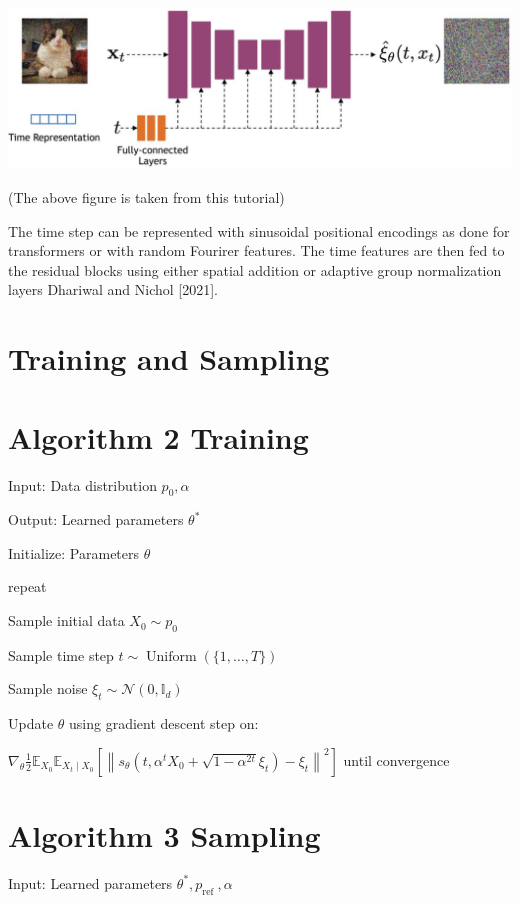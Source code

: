 \documentclass[10pt]{article}
\begin{document}
\begin{center}
\includegraphics[max width=\textwidth]{2024_01_08_a381fc3992661ee7020eg-17}
\end{center}

(The above figure is taken from this tutorial)

The time step can be represented with sinusoidal positional encodings as done for transformers or with random Fourirer features. The time features are then fed to the residual blocks using either spatial addition or adaptive group normalization layers Dhariwal and Nichol [2021].

\section*{Training and Sampling}
\section*{Algorithm 2 Training}
Input: Data distribution $p_{0}, \alpha$

Output: Learned parameters $\theta^{*}$

Initialize: Parameters $\theta$

repeat

Sample initial data $X_{0} \sim p_{0}$

Sample time step $t \sim \operatorname{Uniform}(\{1, \ldots, T\})$

Sample noise $\xi_{t} \sim \mathcal{N}\left(0, \mathbb{I}_{d}\right)$

Update $\theta$ using gradient descent step on:

$\nabla_{\theta} \frac{1}{2} \mathbb{E}_{X_{0}} \mathbb{E}_{X_{t} \mid X_{0}}\left[\left\|s_{\theta}\left(t, \alpha^{t} X_{0}+\sqrt{1-\alpha^{2 t}} \xi_{t}\right)-\xi_{t}\right\|^{2}\right]$ until convergence

\section*{Algorithm 3 Sampling}
Input: Learned parameters $\theta^{*}, p_{\text {ref }}, \alpha$
\end{document}
